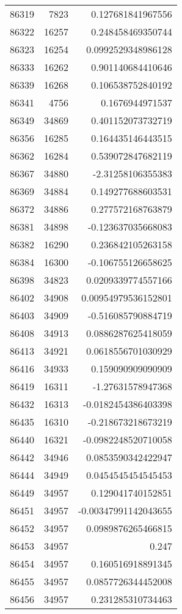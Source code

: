 \begin{tabular}{r | r | r}
86319 & 7823 & 0.127681841967556 \\
86322 & 16257 & 0.248458469350744 \\
86323 & 16254 & 0.0992529348986128 \\
86333 & 16262 & 0.901140684410646 \\
86339 & 16268 & 0.106538752840192 \\
86341 & 4756 & 0.1676944971537 \\
86349 & 34869 & 0.401152073732719 \\
86356 & 16285 & 0.164435146443515 \\
86362 & 16284 & 0.539072847682119 \\
86367 & 34880 & -2.31258106355383 \\
86369 & 34884 & 0.149277688603531 \\
86372 & 34886 & 0.277572168763879 \\
86381 & 34898 & -0.123637035668083 \\
86382 & 16290 & 0.236842105263158 \\
86384 & 16300 & -0.106755126658625 \\
86398 & 34823 & 0.0209339774557166 \\
86402 & 34908 & 0.00954979536152801 \\
86403 & 34909 & -0.516085790884719 \\
86408 & 34913 & 0.0886287625418059 \\
86413 & 34921 & 0.0618556701030929 \\
86416 & 34933 & 0.159090909090909 \\
86419 & 16311 & -1.27631578947368 \\
86432 & 16313 & -0.0182454386403398 \\
86435 & 16310 & -0.218673218673219 \\
86440 & 16321 & -0.0982248520710058 \\
86442 & 34946 & 0.0853590342422947 \\
86444 & 34949 & 0.0454545454545453 \\
86449 & 34957 & 0.129041740152851 \\
86451 & 34957 & -0.00347991142043655 \\
86452 & 34957 & 0.0989876265466815 \\
86453 & 34957 & 0.247 \\
86454 & 34957 & 0.160516918891345 \\
86455 & 34957 & 0.0857726344452008 \\
86456 & 34957 & 0.231285310734463 \\

\end{tabular}

